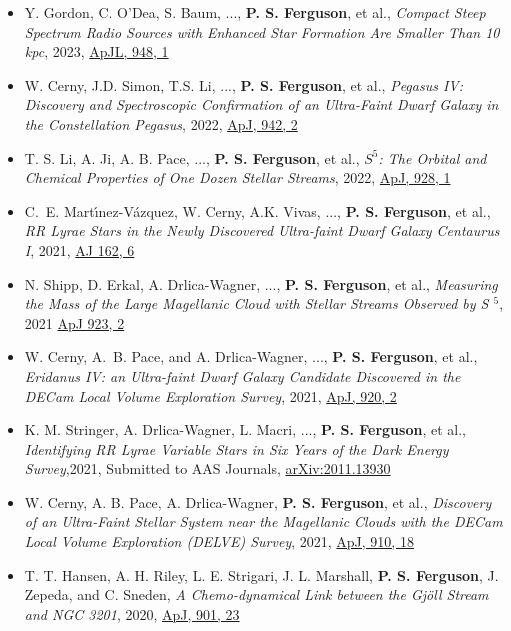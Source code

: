 \begin{itemize}[itemsep=1pt]
    \item Y. Gordon, C. O'Dea, S. Baum, ..., \textbf{P. S. Ferguson}, et al., \textit{Compact Steep Spectrum Radio Sources with Enhanced Star Formation Are Smaller Than 10 kpc}, 2023, \href{https://ui.adsabs.harvard.edu/abs/2023ApJ...948L...9G}{ApJL, 948, 1}
    \item W. Cerny, J.D. Simon, T.S. Li, ..., \textbf{P. S. Ferguson}, et al., \textit{Pegasus IV: Discovery and Spectroscopic Confirmation of an Ultra-Faint Dwarf Galaxy in the Constellation Pegasus}, 2022, \href{https://ui.adsabs.harvard.edu/abs/2022arXiv220311788C/abstract}{ApJ, 942, 2}
    \item T. S. Li, A. Ji, A. B. Pace, ..., \textbf{P. S. Ferguson}, et al., \textit{$S^5$: The Orbital and Chemical Properties of One Dozen Stellar Streams}, 2022,  \href{https://ui.adsabs.harvard.edu/abs/2021arXiv211006950L/abstract}{ApJ, 928, 1}
    \item C.~E. Mart{\'\i}nez-V{\'a}zquez, W. Cerny, A.K. Vivas, ..., \textbf{P. S. Ferguson}, et al., \textit{RR Lyrae Stars in the Newly Discovered Ultra-faint Dwarf Galaxy Centaurus I}, 2021, \href{https://ui.adsabs.harvard.edu/abs/2021AJ....162..253M/abstract} {AJ 162, 6}
    \item N. Shipp, D. Erkal, A. Drlica-Wagner, ..., \textbf{P. S. Ferguson}, et al., \textit{Measuring the Mass of the Large Magellanic Cloud with Stellar Streams Observed by S $^{5}$}, 2021 \href{https://ui.adsabs.harvard.edu/abs/2021ApJ...923..149S/abstract}{ApJ 923, 2}
    \item W. Cerny, A.~B. Pace,  and A. Drlica-Wagner, ..., \textbf{P. S. Ferguson}, et al., \textit{Eridanus IV: an Ultra-faint Dwarf Galaxy Candidate Discovered in the DECam Local Volume Exploration Survey}, 2021, \href{https://ui.adsabs.harvard.edu/abs/2021ApJ...920L..44C/abstract}{ApJ, 920, 2}
    \item K. M. Stringer, A. Drlica-Wagner, L. Macri, ..., \textbf{P. S. Ferguson}, et al., \textit{Identifying RR Lyrae Variable Stars in Six Years of the Dark Energy Survey},2021, Submitted to AAS Journals, \href{https://arxiv.org/abs/arXiv:2011.13930}{arXiv:2011.13930}
    \item W. Cerny, A. B. Pace, A. Drlica-Wagner, \textbf{P. S. Ferguson}, et al., \textit{Discovery of an Ultra-Faint Stellar System near the Magellanic Clouds with the DECam Local Volume Exploration (DELVE) Survey}, 2021, \href{https://doi.org/10.3847/1538-4357/abe1af}{ApJ, 910, 18}

    \item T. T. Hansen, A. H. Riley, L. E. Strigari, J. L. Marshall, \textbf{P. S. Ferguson}, J. Zepeda, and C. Sneden, \textit{A Chemo-dynamical Link between the Gjöll Stream and NGC 3201}, 2020, \href{https://doi.org/10.3847/1538-4357/ababa5}{ApJ, 901, 23}
    

\end{itemize}
